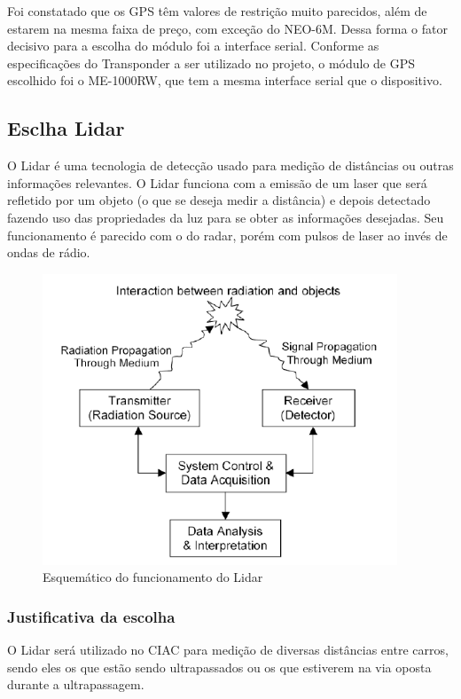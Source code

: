 Foi constatado que os GPS têm valores de restrição muito parecidos, além de
estarem na mesma faixa de preço, com exceção do NEO-6M. Dessa forma o fator
decisivo para a escolha do módulo foi a interface serial. Conforme as
especificações do Transponder a ser utilizado no projeto, o módulo de GPS
  escolhido foi o ME-1000RW, que tem a mesma interface serial que o dispositivo.

\subsection{Esclha Lidar}

O Lidar é uma tecnologia de detecção usado para medição de distâncias ou
outras informações relevantes. O Lidar funciona com a emissão de um laser
que será refletido por um objeto (o que se deseja medir a distância) e depois
detectado fazendo uso das propriedades da luz para se obter as informações
desejadas. Seu funcionamento é parecido com o do radar, porém com pulsos de
laser ao invés de ondas de rádio.


\begin{figure}[h]
  \centering
  \includegraphics[width=400px, scale=1]{figuras/funcionamento_lidar}
  \caption{Esquemático do funcionamento do Lidar}
\label{fig:funcionamento_lidar}
\end{figure}

\subsubsection{Justificativa da escolha}
O Lidar será utilizado no CIAC para medição de diversas distâncias entre carros,
sendo eles os que estão sendo ultrapassados ou os que estiverem na via oposta
durante a ultrapassagem.

